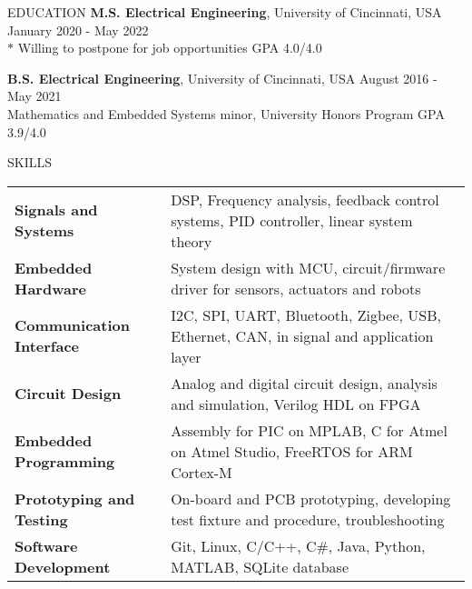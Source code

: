 \documentclass{../lib/resume} %
\begin{document}

    \begin{rSection}{EDUCATION}
        {\bf M.S. Electrical Engineering}, University of Cincinnati, USA \hfill {January 2020 - May 2022} \\
        $*$ Willing to postpone for job opportunities \hfill GPA 4.0/4.0 \smallskip

        {\bf B.S. Electrical Engineering}, University of Cincinnati, USA \hfill {August 2016 - May 2021}\\
        Mathematics and Embedded Systems minor, University Honors Program \hfill {GPA 3.9/4.0}




    \end{rSection}

    \begin{rSection}{SKILLS}

        \begin{tabular}{ @{} >{\bfseries}l @{\hspace{2ex}} l }
            Signals and Systems & DSP, Frequency analysis, feedback control systems, PID controller, linear system theory	\\
            Embedded Hardware       & System design with MCU, circuit/firmware driver for sensors, actuators and robots \\
            Communication Interface & I2C, SPI, UART, Bluetooth, Zigbee, USB, Ethernet, CAN, in signal and application layer \\
            Circuit Design & Analog and digital circuit design, analysis and simulation, Verilog HDL on FPGA \\
            Embedded Programming & Assembly for PIC on MPLAB, C for Atmel on Atmel Studio, FreeRTOS for ARM Cortex-M \\
            Prototyping and Testing &  On-board and PCB prototyping, developing test fixture and procedure, troubleshooting	\\
            Software Development & Git, Linux, C/C++, C\#, Java, Python, MATLAB, SQLite database \\
        \end{tabular}
    \end{rSection}
\end{document}
